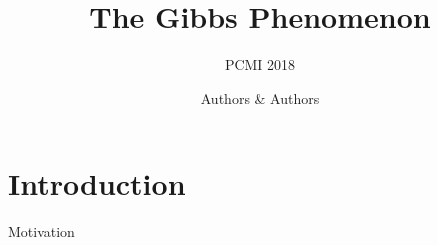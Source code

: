 \documentclass{beamer}
\title{The Gibbs Phenomenon}
\subtitle{PCMI 2018}
\author{Authors \& Authors}
\begin{document}
\begin{frame}
    \titlepage

%        

\end{frame}
\section{Introduction}
\begin{frame}{Motivation}
\end{frame}
\end{document}
